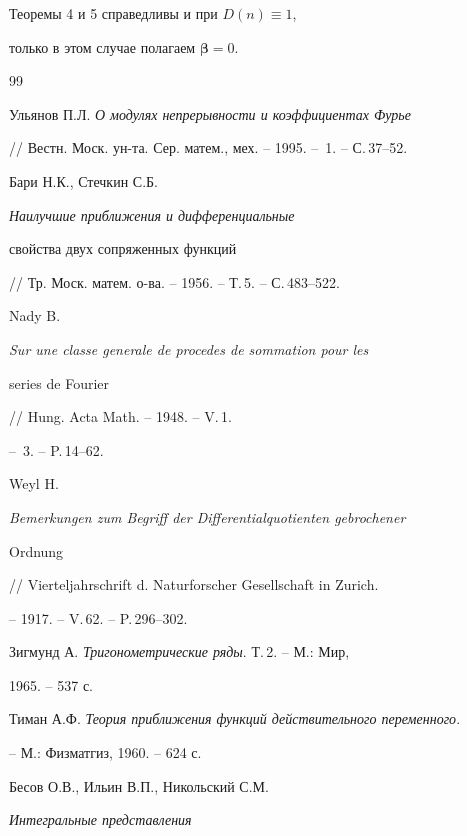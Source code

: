 \begin{note}


Теоремы 4 и 5 справедливы и при $D(n)\equiv1$,


только в этом случае полагаем ${\boldsymbol{\beta}}=0$. 


\end{note}


 


\begin{thebibliography}{99}







Ульянов П.Л. {\em О модулях непрерывности и коэффициентах Фурье} 


// Вестн. Моск. ун-та. Сер. матем., мех. -- 1995. -- \No\,1. -- С.\,37--52.




Бари Н.К., Стечкин С.Б. {\em Наилучшие приближения и дифференциальные 


свойства двух сопряженных функций}


// Тр. Моск. матем. о-ва. -- 1956. -- Т.\,5. -- С.\,483--522.




Nady B. {\em Sur une classe generale de procedes de sommation pour les


series de Fourier} // Hung. Acta Math. -- 1948. -- V.\,1.


-- \No\,3. -- P.\,14--62.




Weyl H. {\em Bemerkungen zum Begriff der Differentialquotienten gebrochener


Ordnung} // Vierteljahrschrift d. Naturforscher Gesellschaft in Zurich.


-- 1917. -- V.\,62. -- P.\,296--302. 




Зигмунд А. {\em Тригонометрические ряды}. Т.\,2. -- М.: Мир,


1965. -- 537 с.




Тиман А.Ф. {\em Теория приближения функций действительного переменного}.


-- М.: Физматгиз, 1960. -- 624 с.




Бесов О.В., Ильин В.П., Никольский С.М. {\em Интегральные представления


}
\end{thebibliography}
